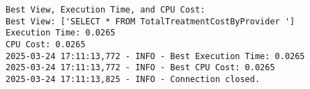 \begin{lstlisting}[style=pythonstyle, caption={Output from python code }, label={lst:pso_query_optimization}]
Best View, Execution Time, and CPU Cost:
Best View: ['SELECT * FROM TotalTreatmentCostByProvider ']
Execution Time: 0.0265
CPU Cost: 0.0265
2025-03-24 17:11:13,772 - INFO - Best Execution Time: 0.0265
2025-03-24 17:11:13,772 - INFO - Best CPU Cost: 0.0265
2025-03-24 17:11:13,825 - INFO - Connection closed.

\end{lstlisting}